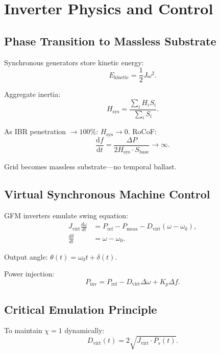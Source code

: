 \documentclass[11pt,letterpaper]{article}
\newcommand{\symchi}{\chi}
\begin{document}
\section{Inverter Physics and Control}

\subsection{Phase Transition to Massless Substrate}

Synchronous generators store kinetic energy:
\begin{equation}
E_{\text{kinetic}} = \frac{1}{2}J\omega^2.
\end{equation}

Aggregate inertia:
\begin{equation}
H_{\text{sys}} = \frac{\sum_i H_i S_i}{\sum_i S_i}.
\end{equation}

As IBR penetration $\to 100\%$: $H_{\text{sys}} \to 0$. RoCoF:
\begin{equation}
\frac{\mathrm{d}f}{\mathrm{d}t} = \frac{\Delta P}{2H_{\text{sys}} \cdot S_{\text{base}}} \to \infty.
\end{equation}

Grid becomes massless substrate—no temporal ballast.

\subsection{Virtual Synchronous Machine Control}

GFM inverters emulate swing equation:
\begin{align}
J_{\text{virt}}\frac{d\omega}{dt} &= P_{\text{ref}} - P_{\text{meas}} - D_{\text{virt}}(\omega - \omega_0), \\
\frac{d\delta}{dt} &= \omega - \omega_0.
\end{align}

Output angle: $\theta(t) = \omega_0 t + \delta(t)$.

Power injection:
\begin{equation}
P_{\text{inv}} = P_{\text{ref}} - D_{\text{virt}}\Delta\omega + K_p\Delta f.
\end{equation}

\subsection{Critical Emulation Principle}

To maintain $\symchi = 1$ dynamically:
\begin{equation}
D_{\text{virt}}(t) = 2\sqrt{J_{\text{virt}} \cdot P_s(t)}.
\end{equation}
\end{document}
